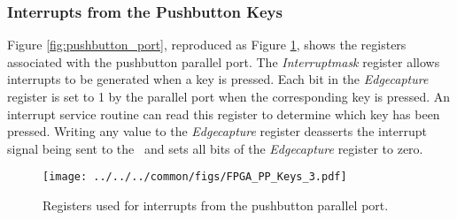 \subsubsection{Interrupts from the Pushbutton Keys}

Figure \ref{fig:pushbutton_port}, reproduced as Figure \ref{fig:pushbutton_port_int},
shows the registers associated with the pushbutton parallel port. 
The {\it Interruptmask} register allows interrupts to be generated when a key is
pressed.  Each bit in the {\it Edgecapture} register is set to 1 by the parallel port when the
corresponding key is pressed. An interrupt service routine can read this register
to determine which key has been pressed.  Writing any value to the
{\it Edgecapture} register deasserts the interrupt signal being sent to the
\GIC~and sets all bits of the {\it Edgecapture} register to zero.

\begin{figure}[h!]
   \begin{center}
       \texttt{[image: ../../../common/figs/FPGA\_PP\_Keys\_3.pdf]}
   \end{center}
   \caption{Registers used for interrupts from the pushbutton parallel port.}
	\label{fig:pushbutton_port_int}
\end{figure}

